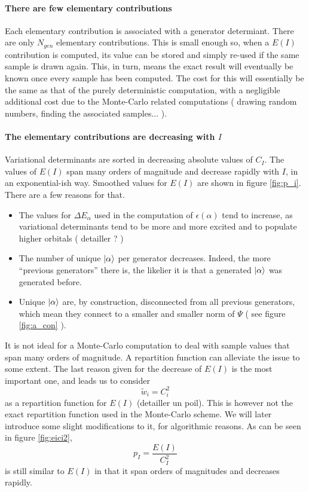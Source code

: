 \documentclass[./thesis.tex]{subfiles}
\begin{document}
\paragraph{There are few elementary contributions}
Each elementary contribution is associated with a generator determiant. There are only $N_{gen}$ elementary contributions. This is small enough so, when a $E(I)$ contribution is computed, its value can be stored and simply re-used if the same sample is drawn again. This, in turn, means the exact result will eventually be known once every sample has been computed. The cost for this will essentially be the same as that of the purely deterministic computation, with a negligible additional cost due to the Monte-Carlo related computations ( drawing random numbers, finding the associated samples... ).

\paragraph{The elementary contributions are decreasing with $I$}
	Variational determinants are sorted in decreasing absolute values of $C_I$.
	The values of $E(I)$ span many orders of magnitude and decrease rapidly with $I$, in an exponential-ish way. Smoothed values for $E(I)$ are shown in figure \ref{fig:p_i}. There are a few reasons for that.
\begin{itemize}
	\item
	The values for $\Delta E_\alpha$ used in the computation of $\epsilon(\alpha)$ tend to increase, as variational determinants tend to be more and more excited and to populate higher orbitals ( detailler ? )
	\item
	The number of unique $\ket \alpha$ per generator decreases. Indeed, the more ``previous generators'' there is, the likelier it is that a generated $\ket \alpha$ was generated before.
	\item
	Unique $\ket \alpha$ are, by construction, disconnected from all previous generators, which mean they connect to a smaller and smaller norm of $\Psi$ ( see figure \ref{fig:a_con} ). 
\end{itemize}
It is not ideal for a Monte-Carlo computation to deal with sample values that span many orders of magnitude. A repartition function can alleviate the issue to some extent.
The last reason given for the decrease of $E(I)$ is the most important one, and leads us to consider
$$\tilde w_i = C_i^2$$
as a repartition function for $E(I)$ (detailler un poil). This is however not the exact repartition function used in the Monte-Carlo scheme. We will later introduce some slight modifications to it, for algorithmic reasons. As can be seen in figure \ref{fig:eici2}, $$p_I = \frac{E(I)}{C_I^2}$$ is  still similar to $E(I)$ in that it span orders of magnitudes and decreases rapidly.
\end{document}
